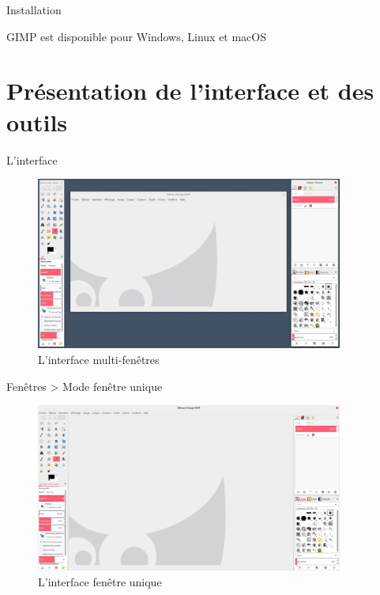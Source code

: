 \documentclass[10pt,svgnames,usenames,table]{beamer}
\begin{document}
\begin{frame}{Installation}
    \begin{center}
    GIMP est disponible pour Windows, Linux et macOS
    \vspace{1cm}\Large
    \end{center}
\end{frame}

\section{Présentation de l'interface et des outils}
\begin{frame}[allowframebreaks]{L'interface}
    \begin{figure}
        \centering
        \includegraphics[width=0.9\textwidth]{Images/gimp_multiple_windows.png}
        \caption{L'interface multi-fenêtres}
    \end{figure} 
    \framebreak
    \begin{center}
        Fenêtres > Mode fenêtre unique
        \begin{figure}
            \includegraphics[width=0.9\textwidth]{Images/gimp_single_window.png}
            \caption{L'interface fenêtre unique}
        \end{figure}
    \end{center}
\end{frame}
\end{document}
